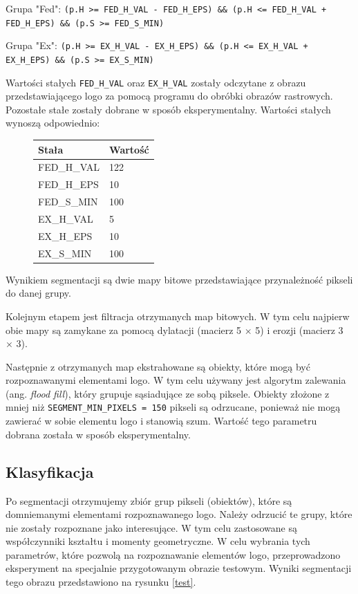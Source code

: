 \documentclass[12pt, oneside, final]{report}
\begin{document}
Grupa "Fed": \texttt{(p.H >= FED\_H\_VAL - FED\_H\_EPS) \&\& (p.H <= FED\_H\_VAL + FED\_H\_EPS) \&\& (p.S >= FED\_S\_MIN)}

Grupa "Ex": \texttt{(p.H >= EX\_H\_VAL - EX\_H\_EPS) \&\& (p.H <= EX\_H\_VAL + EX\_H\_EPS) \&\& (p.S >= EX\_S\_MIN)}

Wartości stałych \texttt{FED\_H\_VAL} oraz \texttt{EX\_H\_VAL} zostały odczytane z obrazu przedstawiającego logo za pomocą programu do obróbki obrazów rastrowych. Pozostałe stałe zostały dobrane w sposób eksperymentalny. Wartości stałych wynoszą odpowiednio:
\begin{figure}[ht!]
	\centering
	\begin{tabular}{|l|l|}
		\hline
		Stała & Wartość\\
		\hline
		FED\_H\_VAL & 122\\
		FED\_H\_EPS & 10\\
		FED\_S\_MIN & 100\\
		EX\_H\_VAL & 5\\
		EX\_H\_EPS & 10\\
		EX\_S\_MIN & 100\\
		\hline
	\end{tabular}
\end{figure}

Wynikiem segmentacji są dwie mapy bitowe przedstawiające przynależność pikseli do danej grupy.

Kolejnym etapem jest filtracja otrzymanych map bitowych. W tym celu najpierw obie mapy są zamykane za pomocą dylatacji (macierz 5 $\times$ 5) i erozji (macierz 3 $\times$ 3).

Następnie z otrzymanych map ekstrahowane są obiekty, które mogą być rozpoznawanymi elementami logo. W tym celu używany jest algorytm zalewania (ang. \textit{flood fill}), który grupuje sąsiadujące ze sobą piksele. Obiekty złożone z mniej niż \texttt{SEGMENT\_MIN\_PIXELS = 150} pikseli są odrzucane, ponieważ nie mogą zawierać w sobie elementu logo i stanowią szum. Wartość tego parametru dobrana została w sposób eksperymentalny.

\subsection*{Klasyfikacja}
Po segmentacji otrzymujemy zbiór grup pikseli (obiektów), które są domniemanymi elementami rozpoznawanego logo. Należy odrzucić te grupy, które nie zostały rozpoznane jako interesujące. W tym celu zastosowane są współczynniki kształtu i momenty geometryczne. W celu wybrania tych parametrów, które pozwolą na rozpoznawanie elementów logo, przeprowadzono eksperyment na specjalnie przygotowanym obrazie testowym. Wyniki segmentacji tego obrazu przedstawiono na rysunku \ref{test}.
\end{document}

